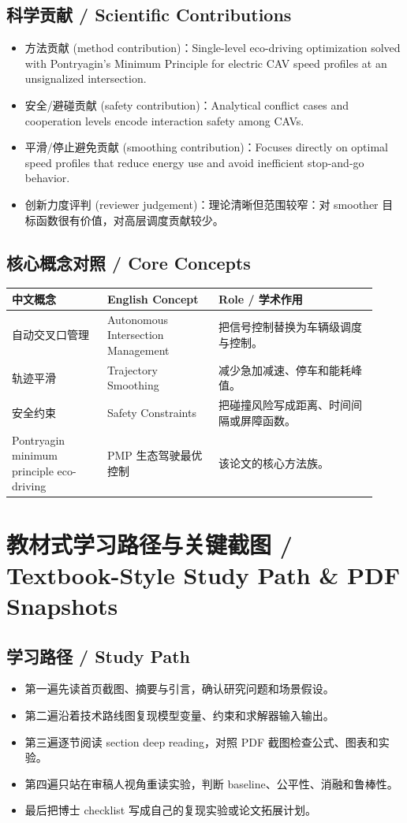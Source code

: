 \documentclass[UTF8,a4paper,11pt,fontset=fandol]{ctexart}
\begin{document}
\subsection{科学贡献 / Scientific Contributions}
\begin{itemize}
\item 方法贡献 (method contribution)：Single-level eco-driving optimization solved with Pontryagin's Minimum Principle for electric CAV speed profiles at an unsignalized intersection.
\item 安全/避碰贡献 (safety contribution)：Analytical conflict cases and cooperation levels encode interaction safety among CAVs.
\item 平滑/停止避免贡献 (smoothing contribution)：Focuses directly on optimal speed profiles that reduce energy use and avoid inefficient stop-and-go behavior.
\item 创新力度评判 (reviewer judgement)：理论清晰但范围较窄：对 smoother 目标函数很有价值，对高层调度贡献较少。
\end{itemize}


\subsection{核心概念对照 / Core Concepts}
\begin{longtable}{p{0.24\linewidth}p{0.28\linewidth}p{0.40\linewidth}}
\toprule
中文概念 & English Concept & Role / 学术作用\\
\midrule
自动交叉口管理 & Autonomous Intersection Management & 把信号控制替换为车辆级调度与控制。 \\
轨迹平滑 & Trajectory Smoothing & 减少急加减速、停车和能耗峰值。 \\
安全约束 & Safety Constraints & 把碰撞风险写成距离、时间间隔或屏障函数。 \\
Pontryagin minimum principle eco-driving & PMP 生态驾驶最优控制 & 该论文的核心方法族。 \\
\bottomrule
\end{longtable}

\section{教材式学习路径与关键截图 / Textbook-Style Study Path \& PDF Snapshots}
\subsection{学习路径 / Study Path}
\begin{itemize}
\item 第一遍先读首页截图、摘要与引言，确认研究问题和场景假设。
\item 第二遍沿着技术路线图复现模型变量、约束和求解器输入输出。
\item 第三遍逐节阅读 section deep reading，对照 PDF 截图检查公式、图表和实验。
\item 第四遍只站在审稿人视角重读实验，判断 baseline、公平性、消融和鲁棒性。
\item 最后把博士 checklist 写成自己的复现实验或论文拓展计划。
\end{itemize}
\end{document}
